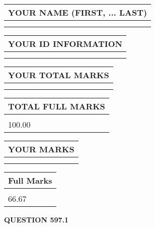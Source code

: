 \documentclass{ctexart}
\begin{document}
   
   
   
\newpage 
\setcounter{page}{ 
   597001 } 
   
   
   
   
\noindent\begin{tabular}{|l|}
\hline
YOUR NAME (FIRST, ... LAST)  \\
\hline
 \\ 
 \\ 
\hline
\end{tabular}
\hspace{0.05in} \begin{tabular}{|l|}
\hline
 YOUR   ID   INFORMATION  \\
\hline
 \\ 
 \\ 
\hline
\end{tabular}
   
   
\vspace{0.2in}\noindent\begin{tabular}{|l|}
\hline
YOUR TOTAL MARKS  \\
\hline
 \\ 
 \\ 
\hline
\end{tabular}
\hspace{0.05in} \begin{tabular}{|l|}
\hline
TOTAL FULL MARKS  \\
\hline
 \\ 
100.00 \\
\hline
\end{tabular}
   
   
 \vspace{0.2in}
 
 
 
 
   
   
  
\vspace{0.2in}
  
\noindent\begin{tabular}{|l|}
\hline
 YOUR MARKS  \\
\hline
 \\ 
 \\ 
\hline
\end{tabular}
\hspace{0.05in} \begin{tabular}{|l|}
\hline
 Full Marks  \\
\hline
 \\ 
66.67 \\
\hline
\end{tabular}
{\textbf{\Large{QUESTION
597.1 
}}}
  
\end{document}
